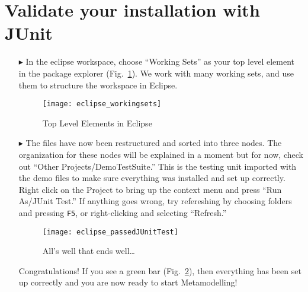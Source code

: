 \newpage
\genHeader

\section{Validate your installation with JUnit}

\begin{itemize}

\item[$\blacktriangleright$] In the eclipse workspace, choose ``Working Sets'' as your top level element in the package explorer (Fig.~\ref{fig_topLevel}). We work with many working sets, and use them to structure the workspace in Eclipse.

\begin{figure}[htbp]
	\centering
  \texttt{[image: eclipse\_workingsets]}
	\caption{Top Level Elements in Eclipse}
	\label{fig_topLevel}
\end{figure}

\item[$\blacktriangleright$] The files have now been restructured and sorted into three nodes. The organization for these nodes will be explained in a moment but for now, check out ``Other Projects/DemoTestSuite.'' This is the testing unit imported with the demo files to make sure everything was installed and set up correctly. Right click on the Project to bring up the context menu and press ``Run As/JUnit Test.'' If anything goes wrong, try refereshing by choosing folders and pressing  \texttt{F5}, or right-clicking and selecting ``Refresh.''

\vspace{0.5cm}

\begin{figure}[htbp]
	\centering
  \texttt{[image: eclipse\_passedJUnitTest]}
	\caption{All's well that ends well\ldots}
	\label{fig_passedTest}
\end{figure}

\vspace{0.5cm}

Congratulations!  If you see a green bar  (Fig.~\ref{fig_passedTest}), then everything has been set up correctly and you are now ready to start Metamodelling!

\end{itemize}

\newpage
\mbox{}